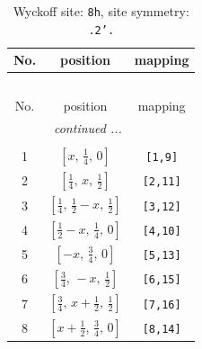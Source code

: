 \documentclass[fleqn,8pt]{jsarticle}
\begin{document}
\begin{longtable}{ccc}
\caption{Wyckoff site: {\tt 8h}, site symmetry: {\tt .2'.}}
 \\
 \hline \hline
No. & position & mapping \\ \hline \endfirsthead

\multicolumn{2}{l}{\tablename\ \thetable{}} \\
 \hline \hline
No. & position & mapping \\ \hline \endhead

 \hline \hline
\multicolumn{2}{r}{\footnotesize\it continued ...} \\ \endfoot

 \hline \hline
\multicolumn{2}{r}{} \\ \endlastfoot

1 & $\left[ x,\, \frac{1}{4},\, 0 \right]$ & {\tt [1,9]} \\ \hline
2 & $\left[ \frac{1}{4},\, x,\, \frac{1}{2} \right]$ & {\tt [2,11]} \\ \hline
3 & $\left[ \frac{1}{4},\, \frac{1}{2} - x,\, \frac{1}{2} \right]$ & {\tt [3,12]} \\ \hline
4 & $\left[ \frac{1}{2} - x,\, \frac{1}{4},\, 0 \right]$ & {\tt [4,10]} \\ \hline
5 & $\left[ - x,\, \frac{3}{4},\, 0 \right]$ & {\tt [5,13]} \\ \hline
6 & $\left[ \frac{3}{4},\, - x,\, \frac{1}{2} \right]$ & {\tt [6,15]} \\ \hline
7 & $\left[ \frac{3}{4},\, x + \frac{1}{2},\, \frac{1}{2} \right]$ & {\tt [7,16]} \\ \hline
8 & $\left[ x + \frac{1}{2},\, \frac{3}{4},\, 0 \right]$ & {\tt [8,14]} \\
\end{longtable}
\renewcommand{\arraystretch}{1.2}
\end{document}
